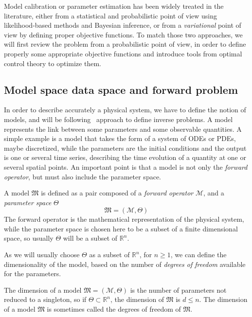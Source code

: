 \documentclass[../../Main_ManuscritThese.tex]{subfiles}
\begin{document}
Model calibration or parameter estimation has been widely treated in the literature, either from a statistical and probabilistic point of view using likelihood-based methods and Bayesian inference, or from a \emph{variational} point of view by defining proper objective functions. To match those two approaches, we will first review the problem from a probabilistic point of view, in order to define properly some appropriate objective functions and introduce tools from optimal control theory to optimize them.

 \subsection{Model space data space and forward problem}
\label{sec:model_space_data_space}
In order to describe accurately a physical system, we have to define the notion of models, and will be following~\cite{tarantola_inverse_2005} approach to define inverse problems.
 A model represents the link between some parameters and some observable quantities.  A simple example is a model that takes the form of a system of ODEs or PDEs, maybe discretized, while the parameters are the initial conditions and the output is one or several time series, describing the time evolution of a quantity at one or several spatial points. An important point is that a model is not only the \emph{forward operator}, but must also include the parameter space.


 \begin{definition}[Model]
   \label{def:model}
  A model $\mathfrak{M}$ is defined as a pair composed of a \emph{forward operator} $\mathcal{M}$, and a \emph{parameter space} $\Theta$
  \begin{equation}
    \mathfrak{M} = (\mathcal{M}, \Theta)
  \end{equation}
The forward operator is the mathematical representation of the physical system, while the parameter space is chosen here to be a subset of a finite dimensional space, so usually $\Theta$ will be a subset of $\mathbb{R}^n$.
\end{definition}
As we will usually choose $\Theta$ as a subset of $\mathbb{R}^n$, for $n\geq 1$, we can define the dimensionality of the model, based on the number of \emph{degrees of freedom} available for the parameters.


\begin{remark}
  \label{rmk:model_dimension}
  The dimension of a model $\mathfrak{M}=(\mathcal{M},\Theta)$ is the number of parameters not reduced to a singleton, so if $\Theta \subset \mathbb{R}^n$, the dimension of $\mathfrak{M}$ is $d \leq n$. The dimension of a model $\mathfrak{M}$ is sometimes called the degrees of freedom of $\mathfrak{M}$.
  \end{remark}
\end{document}
